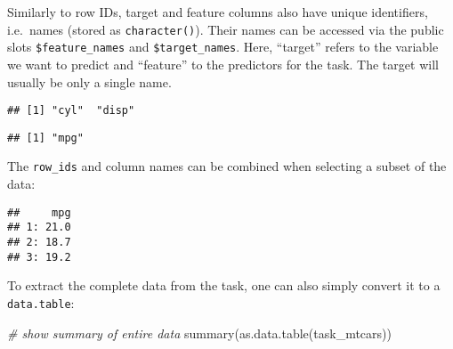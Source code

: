 \documentclass[
]{scrbook}
\newenvironment{Shaded}{\begin{snugshade}}{\end{snugshade}}
\newcommand{\AttributeTok}[1]{\textcolor[rgb]{0.77,0.63,0.00}{#1}}
\newcommand{\CommentTok}[1]{\textcolor[rgb]{0.56,0.35,0.01}{\textit{#1}}}
\newcommand{\DecValTok}[1]{\textcolor[rgb]{0.00,0.00,0.81}{#1}}
\newcommand{\FunctionTok}[1]{\textcolor[rgb]{0.00,0.00,0.00}{#1}}
\newcommand{\NormalTok}[1]{#1}
\newcommand{\SpecialCharTok}[1]{\textcolor[rgb]{0.00,0.00,0.00}{#1}}
\newcommand{\StringTok}[1]{\textcolor[rgb]{0.31,0.60,0.02}{#1}}
\renewenvironment{Shaded} {\begin{snugshade}\small} {\end{snugshade}}
\begin{document}
Similarly to row IDs, target and feature columns also have unique identifiers, i.e.~names (stored as \texttt{character()}).
Their names can be accessed via the public slots \texttt{\$feature\_names} and \texttt{\$target\_names}.
Here, ``target'' refers to the variable we want to predict and ``feature'' to the predictors for the task.
The target will usually be only a single name.

\begin{Shaded}
\end{Shaded}

\begin{verbatim}
## [1] "cyl"  "disp"
\end{verbatim}

\begin{Shaded}
\end{Shaded}

\begin{verbatim}
## [1] "mpg"
\end{verbatim}

The \texttt{row\_ids} and column names can be combined when selecting a subset of the data:

\begin{Shaded}
\end{Shaded}

\begin{verbatim}
##     mpg
## 1: 21.0
## 2: 18.7
## 3: 19.2
\end{verbatim}

To extract the complete data from the task, one can also simply convert it to a \texttt{data.table}:

\begin{Shaded}
\begin{Highlighting}[]
\CommentTok{\# show summary of entire data}
\FunctionTok{summary}\NormalTok{(}\FunctionTok{as.data.table}\NormalTok{(task\_mtcars))}
\end{Highlighting}
\end{Shaded}
\end{document}
